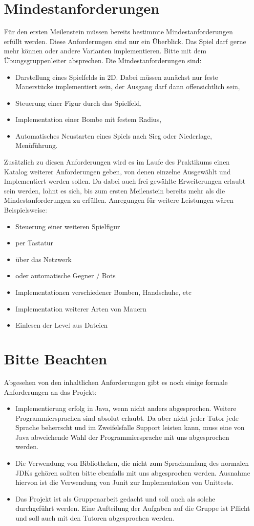 \documentclass{programmierpraktikum}
\begin{document}
\section{Mindestanforderungen}
Für den ersten Meilenstein müssen bereits bestimmte Mindestanforderungen erfüllt werden. Diese
Anforderungen sind nur ein Überblick. Das Spiel darf gerne mehr können oder andere Varianten
implementieren. Bitte mit dem Übungsgruppenleiter absprechen.
Die Mindestanforderungen sind:
\begin{itemize}
  \item Darstellung eines Spielfelds in 2D. Dabei müssen zunächst nur feste Mauerstücke implementiert sein, der Ausgang darf dann offensichtlich sein,
  \item Steuerung einer Figur durch das Spielfeld,
  \item Implementation einer Bombe mit festem Radius,
  \item Automatisches Neustarten eines Spiels nach Sieg oder Niederlage, Menüführung.
\end{itemize}
Zusätzlich zu diesen Anforderungen wird es im Laufe des Praktikums einen Katalog weiterer
Anforderungen geben, von denen einzelne Ausgewählt und Implementiert werden sollen. Da dabei
auch frei gewählte Erweiterungen erlaubt sein werden, lohnt es sich, bis zum ersten Meilenstein
bereits mehr als die Mindestanforderungen zu erfüllen.
Anregungen für weitere Leistungen wären Beispielsweise:
\begin{itemize}
  \item Steuerung einer weiteren Spielfigur
  \item per Tastatur
  \item über das Netzwerk
  \item oder automatische Gegner / Bots
  \item Implementationen verschiedener Bomben, Handschuhe, etc
  \item Implementation weiterer Arten von Mauern
  \item Einlesen der Level aus Dateien
\end{itemize}
\section{Bitte Beachten}
Abgesehen von den inhaltlichen Anforderungen gibt es noch einige formale Anforderungen an das
Projekt:
\begin{itemize}
  \item Implementierung erfolg in Java, wenn nicht anders abgesprochen. Weitere Programmiersprachen sind absolut erlaubt. Da aber nicht jeder Tutor jede Sprache beherrscht und im Zweifelsfalle Support leisten kann, muss eine von Java abweichende Wahl der Programmiersprache mit uns abgesprochen werden.
  \item Die Verwendung von Bibliotheken, die nicht zum Sprachumfang des normalen JDKs gehören sollten bitte ebenfalls mit uns abgesprochen werden. Ausnahme hiervon ist die Verwendung von Junit zur Implementation von Unittests.
  \item Das Projekt ist als Gruppenarbeit gedacht und soll auch als solche durchgeführt werden.  Eine Aufteilung der Aufgaben auf die Gruppe ist Pflicht und soll auch mit den Tutoren abgesprochen werden.
\end{itemize}
\end{document}
